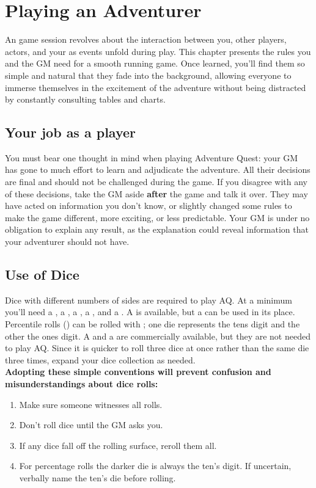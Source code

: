 \chapter{Playing an Adventurer}
\label{ch:play-adventurer}
An \aq game session revolves about the interaction between you, other players, actors, and your  as events unfold during play. This chapter presents the rules you and the GM need for a smooth running game. Once learned, you'll find them so simple and natural that they fade into the background, allowing everyone to immerse themselves in the excitement of the adventure without being distracted by constantly consulting tables and charts.
\setlength{\columnsep}{\defcolwidth}
\begin{multicols*}{2}
\section{Your job as a player}
You must bear one thought in mind when playing Adventure Quest: your GM has gone to much effort to learn and adjudicate the adventure. All their decisions are final and
should not be challenged during the game. If you disagree with any of these decisions, take the GM aside \textbf{after} the game and talk it over. They may have acted on information you don't know, or slightly changed some rules to make the game  different, more exciting, or less predictable. Your GM is under no obligation to explain any result, as the explanation could reveal information that your adventurer should not have.
\section{Use of Dice}
Dice with different numbers of sides are required to play AQ. At a minimum you'll need a , a , a , a , and a . A  is available, but a  can be used in its
place. Percentile rolls () can be rolled with  ; one die represents the tens digit and the other the ones digit. A  and a  are commercially available, but they are not needed to play AQ. Since it is quicker to roll three dice at once rather
than the same die three times, expand your dice collection as needed.\\
\textbf{Adopting these simple conventions will prevent confusion and misunderstandings about dice rolls:}
\begin{enumerate}[leftmargin=12pt]
\item Make sure someone witnesses all rolls.
\item Don't roll dice until the GM asks you.
\item If any dice fall off the rolling surface, reroll them all.
\item For percentage rolls the darker die is always the ten's digit. If uncertain, verbally name the ten's die before rolling.
\end{enumerate}

\end{multicols*}
